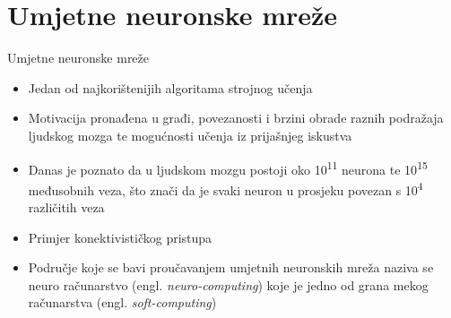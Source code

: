\documentclass{beamer}
\begin{document}
\section{Umjetne neuronske mreže}
    \begin{frame}{Umjetne neuronske mreže}
        \begin{itemize}
            \pause
            \item Jedan od najkorištenijih algoritama strojnog učenja
            \pause
            \item Motivacija pronađena u građi, povezanosti i brzini obrade raznih podražaja ljudskog mozga te mogućnosti učenja iz prijašnjeg iskustva
            \pause
            \item Danas je poznato da u ljudskom mozgu postoji oko 10\textsuperscript{11} neurona te 10\textsuperscript{15} međusobnih veza, što znači da je svaki neuron u prosjeku povezan s 10\textsuperscript{4} različitih veza
            \pause
            \item Primjer konektivističkog pristupa
            \pause
            \item Područje koje se bavi proučavanjem umjetnih neuronskih mreža naziva se neuro računarstvo (engl. \textit{neuro-computing}) koje je jedno od grana mekog računarstva (engl. \textit{soft-computing}) 
        \end{itemize}
    \end{frame}
\end{document}
